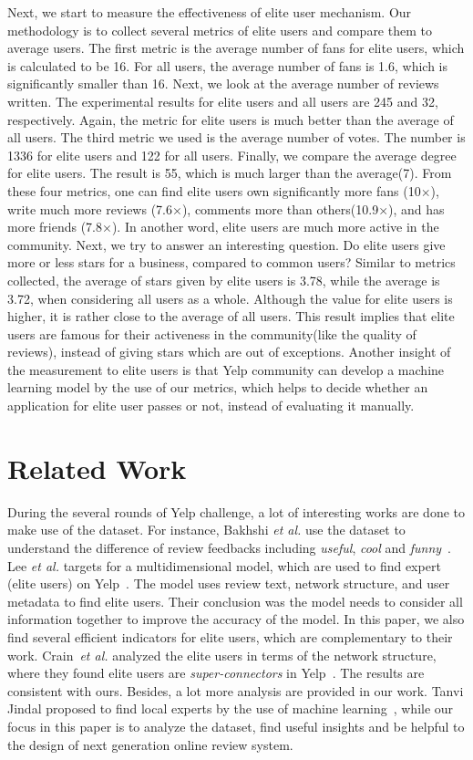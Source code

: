 \documentclass[11pt, oneside]{article}   	%
\begin{document}
Next, we start to measure the effectiveness of elite user mechanism. Our methodology is to collect several 
metrics of elite users and compare them to average users.
The first metric is the average number of fans for elite users, which is calculated to be 16. For all users, the average 
number of fans is 1.6, which is significantly smaller than 16. Next, we look at the average number of reviews written. 
The experimental results for elite users and all users are 245 and 32, respectively. Again, the metric for elite users 
is much better than the average of all users. The third metric we used is the average number of votes. The number is
1336 for elite users and 122 for all users. Finally, we compare the average degree for elite users. The result is 55, which 
is much larger than the average(7). From these four metrics, one can find elite users own significantly more fans 
(10$\times$), write much more reviews (7.6$\times$), comments more than others(10.9$\times$), and has more friends
(7.8$\times$). In another word, elite users are much more active in the community. Next, we try to answer an interesting 
question. Do elite users give more or less stars for a business, compared to common users? 
Similar to metrics collected, the average of stars given by 
elite users is 3.78, while the average is 3.72, when considering all users as a whole. Although the value for elite users
is higher, it is rather close to the average of all users. This result implies that elite users are famous for their activeness 
in the community(like the quality of reviews), instead of giving stars which are out of exceptions. Another insight of the 
measurement to elite users is that Yelp community can develop a machine learning model by the use of our metrics, 
which helps to decide whether an application for elite user passes or not, instead of evaluating it manually. 

\section{Related Work}
During the several rounds of Yelp challenge, a lot of interesting works are done to make use of the dataset. 
For instance, Bakhshi \textit{et al.} use the dataset to understand the difference of review feedbacks including 
\textit{useful}, \textit{cool} and \textit{funny}~\cite{cscw}. Lee \textit{et al.} targets for a multidimensional model, 
which are used to find expert (elite users) on Yelp~\cite{expert}. The model uses review text, network structure, 
and user metadata to find elite users. Their conclusion was the model needs to consider all information together 
to improve the accuracy of the model. In this paper, we also find several efficient indicators for elite users, 
which are complementary to their work. Crain~\textit{et al.} analyzed the elite users in terms of the network 
structure, where they found elite users are \textit{super-connectors}  in Yelp~\cite{stanford}. 
The results are consistent with ours. Besides, a lot more analysis are provided in our work. Tanvi Jindal proposed 
to find local experts by the use of machine learning~\cite{local}, while our focus in this paper is to analyze the 
dataset, find useful insights and be helpful to the design of next generation online review system.
\end{document}
